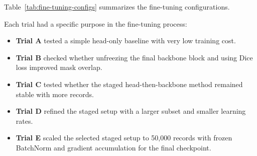 \documentclass[9pt,a4paper,oneside]{rho-class/rho}
\begin{document}
    Table~\ref{tab:fine-tuning-configs} summarizes the fine-tuning configurations.

\begin{table}[H]
    \centering
    \caption{DeepLabV3 fine-tuning configurations.}
    \label{tab:fine-tuning-configs}
\end{table}

    Each trial had a specific purpose in the fine-tuning process:

    \begin{itemize}
        \item \textbf{Trial A} tested a simple head-only baseline with very low training cost.
        \item \textbf{Trial B} checked whether unfreezing the final backbone block and using Dice loss improved mask overlap.
        \item \textbf{Trial C} tested whether the staged head-then-backbone method remained stable with more records.
        \item \textbf{Trial D} refined the staged setup with a larger subset and smaller learning rates.
        \item \textbf{Trial E} scaled the selected staged setup to 50,000 records with frozen BatchNorm and gradient accumulation for the final checkpoint.
    \end{itemize}
\end{document}
